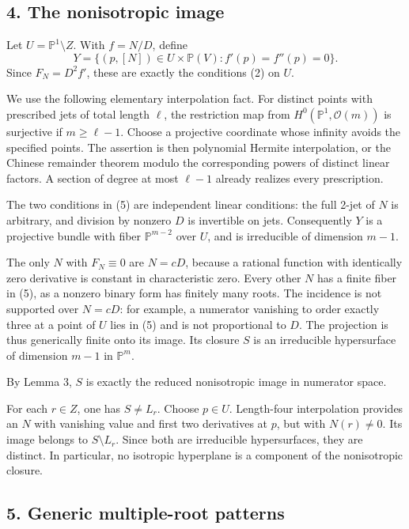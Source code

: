 \documentclass[
  11pt,
]{article}
\begin{document}
\subsection{4. The nonisotropic image}\label{the-nonisotropic-image}

Let \(U=\mathbb P^1\setminus Z\). With \(f=N/D\), define \[
 Y=\{(p,[N])\in U\times\mathbb P(V):f'(p)=f''(p)=0\}.
 \tag{5}
\] Since \(F_N=D^2f'\), these are exactly the conditions (2) on \(U\).

We use the following elementary interpolation fact. For distinct points
with prescribed jets of total length \(\ell\), the restriction map from
\(H^0(\mathbb P^1,\mathcal O(m))\) is surjective if \(m\ge\ell-1\).
Choose a projective coordinate whose infinity avoids the specified
points. The assertion is then polynomial Hermite interpolation, or the
Chinese remainder theorem modulo the corresponding powers of distinct
linear factors. A section of degree at most \(\ell-1\) already realizes
every prescription.

The two conditions in (5) are independent linear conditions: the full
2-jet of \(N\) is arbitrary, and division by nonzero \(D\) is invertible
on jets. Consequently \(Y\) is a projective bundle with fiber
\(\mathbb P^{m-2}\) over \(U\), and is irreducible of dimension \(m-1\).

The only \(N\) with \(F_N\equiv0\) are \(N=cD\), because a rational
function with identically zero derivative is constant in characteristic
zero. Every other \(N\) has a finite fiber in (5), as a nonzero binary
form has finitely many roots. The incidence is not supported over
\(N=cD\): for example, a numerator vanishing to order exactly three at a
point of \(U\) lies in (5) and is not proportional to \(D\). The
projection is thus generically finite onto its image. Its closure \(S\)
is an irreducible hypersurface of dimension \(m-1\) in \(\mathbb P^m\).

By Lemma 3, \(S\) is exactly the reduced nonisotropic image in numerator
space.

For each \(r\in Z\), one has \(S\ne L_r\). Choose \(p\in U\).
Length-four interpolation provides an \(N\) with vanishing value and
first two derivatives at \(p\), but with \(N(r)\ne0\). Its image belongs
to \(S\setminus L_r\). Since both are irreducible hypersurfaces, they
are distinct. In particular, no isotropic hyperplane is a component of
the nonisotropic closure.

\subsection{5. Generic multiple-root
patterns}\label{generic-multiple-root-patterns}
\end{document}
